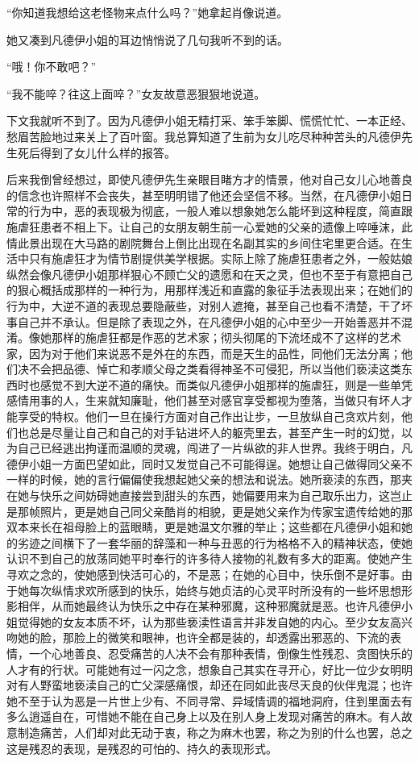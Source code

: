 \par “你知道我想给这老怪物来点什么吗？”她拿起肖像说道。
\par 她又凑到凡德伊小姐的耳边悄悄说了几句我听不到的话。
\par “哦！你不敢吧？”
\par “我不能啐？往这上面啐？”女友故意恶狠狠地说道。
\par 下文我就听不到了。因为凡德伊小姐无精打采、笨手笨脚、慌慌忙忙、一本正经、愁眉苦脸地过来关上了百叶窗。我总算知道了生前为女儿吃尽种种苦头的凡德伊先生死后得到了女儿什么样的报答。
\par 后来我倒曾经想过，即使凡德伊先生亲眼目睹方才的情景，他对自己女儿心地善良的信念也许照样不会丧失，甚至明明错了他还会坚信不移。当然，在凡德伊小姐日常的行为中，恶的表现极为彻底，一般人难以想象她怎么能坏到这种程度，简直跟施虐狂患者不相上下。让自己的女朋友朝生前一心爱她的父亲的遗像上啐唾沫，此情此景出现在大马路的剧院舞台上倒比出现在名副其实的乡间住宅里更合适。在生活中只有施虐狂才为情节剧提供美学根据。实际上除了施虐狂患者之外，一般姑娘纵然会像凡德伊小姐那样狠心不顾亡父的遗愿和在天之灵，但也不至于有意把自己的狠心概括成那样的一种行为，用那样浅近和直露的象征手法表现出来；在她们的行为中，大逆不道的表现总要隐蔽些，对别人遮掩，甚至自己也看不清楚，干了坏事自己并不承认。但是除了表现之外，在凡德伊小姐的心中至少一开始善恶并不混淆。像她那样的施虐狂都是作恶的艺术家；彻头彻尾的下流坯成不了这样的艺术家，因为对于他们来说恶不是外在的东西，而是天生的品性，同他们无法分离；他们决不会把品德、悼亡和孝顺父母之类看得神圣不可侵犯，所以当他们亵渎这类东西时也感觉不到大逆不道的痛快。而类似凡德伊小姐那样的施虐狂，则是一些单凭感情用事的人，生来就知廉耻，他们甚至对感官享受都视为堕落，当做只有坏人才能享受的特权。他们一旦在操行方面对自己作出让步，一旦放纵自己贪欢片刻，他们也总是尽量让自己和自己的对手钻进坏人的躯壳里去，甚至产生一时的幻觉，以为自己已经逃出拘谨而温顺的灵魂，闯进了一片纵欲的非人世界。我终于明白，凡德伊小姐一方面巴望如此，同时又发觉自己不可能得逞。她想让自己做得同父亲不一样的时候，她的言行偏偏使我想起她父亲的想法和说法。她所亵渎的东西，那夹在她与快乐之间妨碍她直接尝到甜头的东西，她偏要用来为自己取乐出力，这岂止是那帧照片，更是她自己同父亲酷肖的相貌，更是她父亲作为传家宝遗传给她的那双本来长在祖母脸上的蓝眼睛，更是她温文尔雅的举止；这些都在凡德伊小姐和她的劣迹之间横下了一套华丽的辞藻和一种与丑恶的行为格格不入的精神状态，使她认识不到自己的放荡同她平时奉行的许多待人接物的礼数有多大的距离。使她产生寻欢之念的，使她感到快活可心的，不是恶；在她的心目中，快乐倒不是好事。由于她每次纵情求欢所感到的快乐，始终与她贞洁的心灵平时所没有的一些坏思想形影相伴，从而她最终认为快乐之中存在某种邪魔，这种邪魔就是恶。也许凡德伊小姐觉得她的女友本质不坏，认为那些亵渎性语言并非发自她的内心。至少女友高兴吻她的脸，那脸上的微笑和眼神，也许全都是装的，却透露出邪恶的、下流的表情，一个心地善良、忍受痛苦的人决不会有那种表情，倒像生性残忍、贪图快乐的人才有的行状。可能她有过一闪之念，想象自己其实在寻开心，好比一位少女明明对有人野蛮地亵渎自己的亡父深感痛恨，却还在同如此丧尽天良的伙伴鬼混；也许她不至于认为恶是一片世上少有、不同寻常、异域情调的福地洞府，住到里面去有多么逍遥自在，可惜她不能在自己身上以及在别人身上发现对痛苦的麻木。有人故意制造痛苦，人们却对此无动于衷，称之为麻木也罢，称之为别的什么也罢，总之这是残忍的表现，是残忍的可怕的、持久的表现形式。
